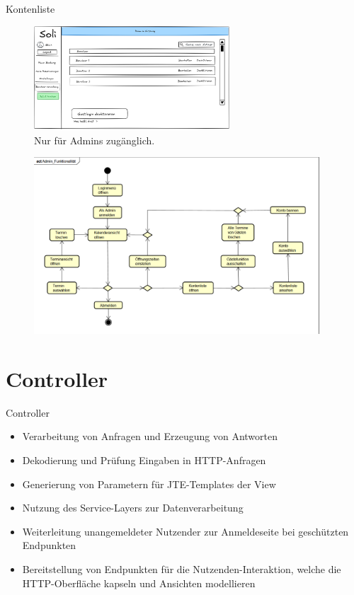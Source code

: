 \documentclass{sdqbeamer}
\begin{document}
\begin{frame}{Kontenliste}
    \begin{figure}
        \centering
        \includegraphics[width=0.65\textwidth]{pictures/figures/ui/useradminui}
        \caption{Nur für Admins zugänglich.}
        \label{fig:kontenliste}
    \end{figure}
\end{frame}

\begin{frame}[plain]
    \begin{figure}
        \centering
        \includegraphics[width=0.95\textwidth]{pictures/figures/activity/adminfunk}
        \label{fig:adminfunktionalitaet}
    \end{figure}
\end{frame}

\section{Controller}

\begin{frame}{Controller}
    \begin{itemize}
        \item Verarbeitung von Anfragen und Erzeugung von Antworten
        \item Dekodierung und Prüfung Eingaben in HTTP-Anfragen
        \item Generierung von Parametern für JTE-Templates der View
        \item Nutzung des Service-Layers zur Datenverarbeitung
        \item Weiterleitung unangemeldeter Nutzender zur Anmeldeseite bei geschützten Endpunkten
        \item Bereitstellung von Endpunkten für die Nutzenden-Interaktion, welche die HTTP-Oberfläche kapseln und Ansichten modellieren
    \end{itemize}
\end{frame}
\end{document}
